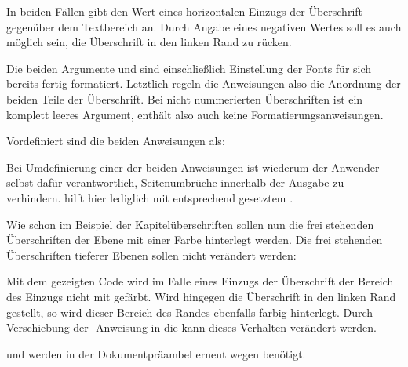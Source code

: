 In beiden Fällen gibt  den Wert eines horizontalen Einzugs
der Überschrift gegenüber dem Textbereich an. Durch Angabe eines negativen
Wertes soll es auch möglich sein, die Überschrift in den linken Rand zu
rücken.

Die beiden Argumente  und  sind einschließlich
Einstellung der Fonts für sich bereits fertig formatiert. Letztlich regeln die
Anweisungen also die Anordnung der beiden Teile der Überschrift. Bei nicht
nummerierten Überschriften ist  ein komplett leeres Argument,
enthält also auch keine Formatierungsanweisungen.

Vordefiniert sind die beiden Anweisungen als:
\begin{lstcode}
\newcommand{\sectionlinesformat}[4]{%
  \@hangfrom{\hskip #2#3}{#4}%
}
\newcommand{\sectioncatchphraseformat}[4]{\hskip #2#3#4}
\end{lstcode}

Bei Umdefinierung einer der beiden Anweisungen ist wiederum der Anwender
selbst dafür verantwortlich, Seitenumbrüche innerhalb der Ausgabe zu
verhindern. \KOMAScript{} hilft hier lediglich mit entsprechend gesetztem
.

\begin{Example}
  Wie schon im Beispiel der Kapitelüberschriften sollen nun die frei stehenden
  Überschriften der Ebene  mit einer Farbe hinterlegt
  werden. Die frei stehenden Überschriften tieferer Ebenen sollen nicht
  verändert werden:
\begin{lstcode}[moretexcs={colorbox}]
  \makeatletter
  \renewcommand{\sectionlinesformat}[4]{%
    \Ifstr{#1}{section}{%
      \hspace*{#2}%
      \colorbox{yellow}{%
        \parbox{\dimexpr\linewidth
                        -2\fboxrule-2\fboxsep-#2}{%
          \raggedsection
          \@hangfrom{#3}{#4}%
        }%
      }%
    }{%
      \@hangfrom{\hskip #2#3}{#4}%
    }%
  }
  \makeatother
\end{lstcode}
  Mit dem gezeigten Code wird im Falle eines Einzugs der Überschrift der
  Bereich des Einzugs nicht mit gefärbt. Wird hingegen die Überschrift in den
  linken Rand gestellt, so wird dieser Bereich des Randes ebenfalls farbig
  hinterlegt. Durch Verschiebung der -Anweisung in die
   kann dieses Verhalten verändert werden.%
  \iffalse Umbruchkorrekturtext

  Erneut sei daran erinnert, dass \Macro{makeatletter} und \Macro{makeatother}
  nur in der Dokumentpräambel zu verwenden sind. In einer eigenen
  Wrapper-Klasse oder einem Paket haben sie zu entfallen. Sie werden auch nur
  wegen \Macro{@hangfrom} in der Definition von \Macro{sectionlinesformat}
  benötigt.%
  \else%

   und  werden in der Dokumentpräambel
  erneut wegen  benötigt.%
  \fi%
\end{Example}

